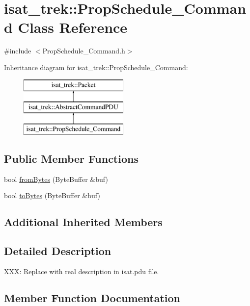 \hypertarget{classisat__trek_1_1_prop_schedule___command}{}\section{isat\+\_\+trek\+:\+:Prop\+Schedule\+\_\+\+Command Class Reference}
\label{classisat__trek_1_1_prop_schedule___command}


{\ttfamily \#include $<$Prop\+Schedule\+\_\+\+Command.\+h$>$}

Inheritance diagram for isat\+\_\+trek\+:\+:Prop\+Schedule\+\_\+\+Command\+:\begin{figure}[H]
\begin{center}
\leavevmode
\includegraphics[height=3.000000cm]{classisat__trek_1_1_prop_schedule___command}
\end{center}
\end{figure}
\subsection*{Public Member Functions}
\begin{DoxyCompactItemize}
\item 
bool \hyperlink{classisat__trek_1_1_prop_schedule___command_af86e57e6f65f6d2a977b082c1f69be09}{from\+Bytes} (Byte\+Buffer \&buf)
\item 
bool \hyperlink{classisat__trek_1_1_prop_schedule___command_a0c18c7191323e932b7c30f9115c059ee}{to\+Bytes} (Byte\+Buffer \&buf)
\end{DoxyCompactItemize}
\subsection*{Additional Inherited Members}


\subsection{Detailed Description}
X\+XX\+: Replace with real description in isat.\+pdu file. 

\subsection{Member Function Documentation}

